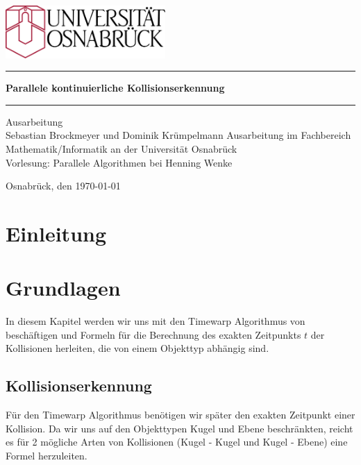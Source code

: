 \documentclass[a4paper, 10pt, openright, parskip, chapterprefix]{scrreprt}
\begin{document}
\begin{titlepage}
\thispagestyle{empty}
\vspace{10mm}
\begin{center}
\includegraphics[height=20mm]{unilogo.eps}
\vfill
\rule{\textwidth}{0.1mm}\vspace{5mm}
\Huge\textbf{Parallele kontinuierliche Kollisionserkennung}
\vspace{1mm}\rule{\textwidth}{0.1mm}
\vfill
\Large
Ausarbeitung\\
Sebastian Brockmeyer und Dominik Krümpelmann
\vfill
\normalsize
Ausarbeitung  im Fachbereich Mathematik/Informatik an der Universität Osnabrück \\
Vorlesung: Parallele Algorithmen bei Henning Wenke

Osnabrück, den \today
\end{center}
\end{titlepage}

\newpage
\mbox{}
\thispagestyle{empty}
\chapter*{Einleitung}
\setcounter{page}{1}

\newpage
\mbox{}
\thispagestyle{empty}
\newpage
\clearpage
\setcounter{page}{2}
\tableofcontents
\listoffigures
\newpage



\chapter{Grundlagen}
In diesem Kapitel werden wir uns mit den Timewarp Algorithmus von~\cite{timewarp} beschäftigen und
Formeln für die Berechnung des exakten Zeitpunkts $t$ der Kollisionen herleiten, die von einem 
Objekttyp abhängig sind.
\section{Kollisionserkennung}

Für den Timewarp Algorithmus benötigen wir später den exakten Zeitpunkt einer Kollision. Da wir uns
auf den Objekttypen Kugel und Ebene beschränkten, reicht es für 2 mögliche Arten von Kollisionen 
(Kugel - Kugel und Kugel - Ebene) eine Formel herzuleiten.\\
\end{document}
